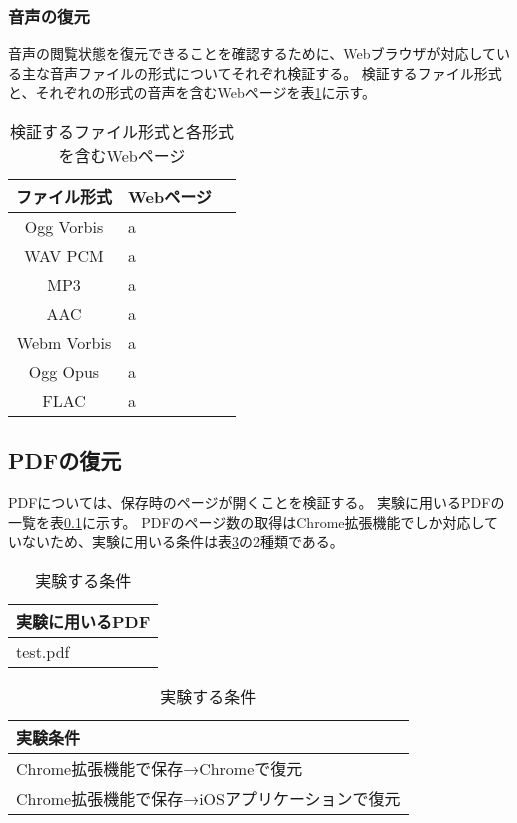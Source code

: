 \subsubsection{音声の復元}
音声の閲覧状態を復元できることを確認するために、Webブラウザが対応している主な音声ファイルの形式についてそれぞれ検証する。
検証するファイル形式と、それぞれの形式の音声を含むWebページを表\ref{tb:evl-audio-check-list}に示す。

\begin{table}[htbp]
  \begin{center}
    \caption{検証するファイル形式と各形式を含むWebページ}
    \label{tb:evl-audio-check-list}
    \begin{tabular}{|c|l|l|}
      \hline
      ファイル形式 & Webページ \\\hline\hline
      Ogg Vorbis & a \\\hline
      WAV PCM & a \\\hline
      MP3 & a \\\hline
      AAC & a \\\hline
      Webm Vorbis & a \\\hline
      Ogg Opus & a \\\hline
      FLAC & a \\\hline
    \end{tabular}
  \end{center}
\end{table}

\subsection{PDFの復元}
PDFについては、保存時のページが開くことを検証する。
実験に用いるPDFの一覧を表\ref{}に示す。
PDFのページ数の取得はChrome拡張機能でしか対応していないため、実験に用いる条件は表\ref{tb:evl-pdf-conditions}の2種類である。

\begin{table}[htbp]
  \label{tb:evl-pdf-list}
  \caption{実験する条件}
  \begin{center}
    \begin{tabular}{|l|}
    \hline
    実験に用いるPDF  \\ \hline
    test.pdf \\ \hline
    \end{tabular}
  \end{center}
\end{table}

\begin{table}[htbp]
  \label{tb:evl-pdf-conditions}
  \caption{実験する条件}
  \begin{center}
    \begin{tabular}{|l|}
    \hline
    実験条件  \\ \hline
    Chrome拡張機能で保存→Chromeで復元 \\ \hline
    Chrome拡張機能で保存→iOSアプリケーションで復元 \\ \hline
    \end{tabular}
  \end{center}
\end{table}
